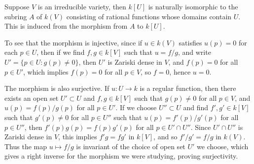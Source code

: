 \begin{example}
    Suppose $V$ is an irreducible variety, then $k[U]$ is naturally isomorphic to the subring $A$ of $k(V)$ consisting of rational functions whose domains contain $U$. This is induced from the morphism from $A$ to $k[U]$.

    To see that the morphism is injective, since if $u \in k(V)$ satisfies $u(p) = 0$ for each $p \in U$, then if we find $f,g \in k[V]$ such that $u = f/g$, and write $U' = \{ p \in U : g(p) \neq 0 \}$, then $U'$ is Zariski dense in $V$, and $f(p) = 0$ for all $p \in U'$, which implies $f(p) = 0$ for all $p \in V$, so $f = 0$, hence $u = 0$.

    The morphism is also surjective. If $u : U \to k$ is a regular function, then there exists an open set $U' \subset U$ and $f,g \in k[V]$ such that $g(p) \neq 0$ for all $p \in V$, and $u(p) = f(p)/g(p)$ for all $p \in U'$. If we choose $U'' \subset U$ and find $f',g' \in k[V]$ such that $g'(p) \neq 0$ for all $p \in U''$ such that $u(p) = f'(p)/g'(p)$ for all $p \in U''$, then $f'(p)g(p) = f(p)g'(p)$ for all $p \in U' \cap U''$. Since $U' \cap U''$ is Zariski dense in $V$, this implies $f'g = fg'$ in $k[V]$, and so $f'/g' = f/g$ in $k(V)$. Thus the map $u \mapsto f/g$ is invariant of the choice of open set $U'$ we choose, which gives a right inverse for the morphism we were studying, proving surjectivity.
\end{example}

